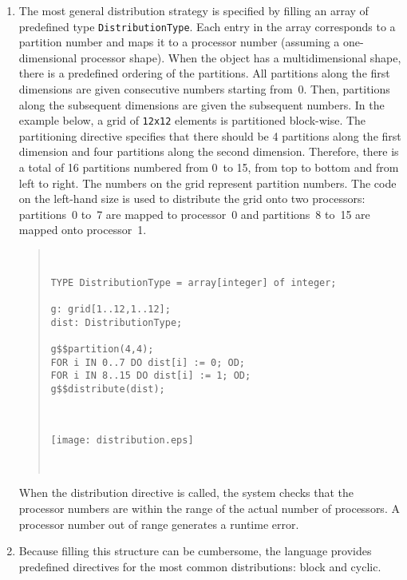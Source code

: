 \documentclass{article}
\newenvironment{example}
  {\begin{quote} ~\hrulefill }
  {~\hrulefill \end{quote} }
\begin{document}
\begin{enumerate}

\item
The most general distribution strategy is specified by filling an
array of predefined type \verb+DistributionType+. Each entry in the
array corresponds to a partition number and maps it to a processor
number (assuming a one-dimensional processor shape). When the object
has a multidimensional shape, there is a predefined ordering of the
partitions. All partitions along the first dimensions are given
consecutive numbers starting from~0. Then, partitions along the
subsequent dimensions are given the subsequent numbers. In the example
below, a grid of \verb+12x12+ elements is partitioned block-wise. The
partitioning directive specifies that there should be 4 partitions
along the first dimension and four partitions along the second
dimension. Therefore, there is a total of 16 partitions numbered from
0~to 15, from top to bottom and from left to right. The numbers on the
grid represent partition numbers. The code on the left-hand size is
used to distribute the grid onto two processors: partitions~0 to~7 are
mapped to processor~0 and partitions~8 to~15 are mapped onto
processor~1.


\begin{example} 

\begin{minipage}{3.5in}
\begin{verbatim}
TYPE DistributionType = array[integer] of integer;

g: grid[1..12,1..12];
dist: DistributionType;

g$$partition(4,4);
FOR i IN 0..7 DO dist[i] := 0; OD;
FOR i IN 8..15 DO dist[i] := 1; OD;
g$$distribute(dist);
\end{verbatim} 
\end{minipage} \ \
\begin{minipage}{2.5in}
\texttt{[image: distribution.eps]}
\end{minipage}

\end{example}


When the distribution directive is called, the system checks that the
processor numbers are within the range of the actual number of
processors. A processor number out of range generates a runtime error.

\item
Because filling this structure can be cumbersome, the language
provides predefined directives for the most common distributions:
block and cyclic. 


\end{enumerate}
\end{document}

